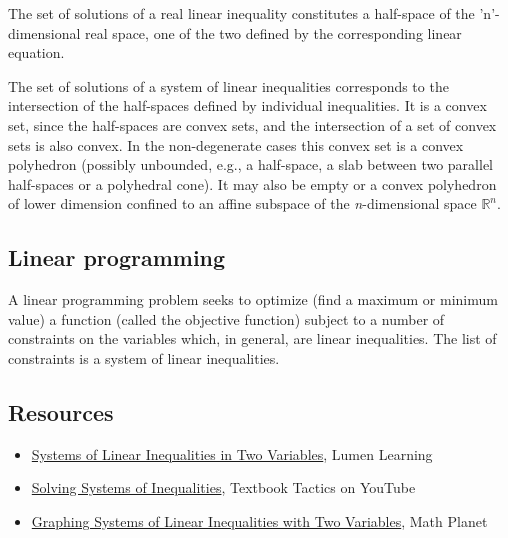 The set of solutions of a real linear inequality constitutes a half-space of the
'n'-dimensional real space, one of the two defined by the corresponding linear equation.



The set of solutions of a system of linear inequalities corresponds to the intersection of
the half-spaces defined by individual inequalities. It is a convex set, since the
half-spaces are convex sets, and the intersection of a set of convex sets is also convex.
In the non-degenerate cases this convex set is a convex polyhedron (possibly unbounded,
e.g., a half-space, a slab between two parallel half-spaces or a polyhedral cone). It may
also be empty or a convex polyhedron of lower dimension confined to an affine subspace of
the \textit{n}-dimensional space $\mathbb{R} ^n$.




\subsection{Linear programming}
\label{sss:line-1d66}




A linear programming problem seeks to optimize (find a maximum or minimum value) a
function (called the objective function) subject to a number of constraints on the
variables which, in general, are linear inequalities. The list of constraints is a system
of linear inequalities.




\subsection{Resources}
\label{sss:reso-55b5}




\begin{itemize}
    \item \href{https://courses.lumenlearning.com/cuny-hunter-collegealgebra/chapter/outcome-graphing-linear-equations/}{Systems of Linear Inequalities in Two Variables}, Lumen Learning
    \item \href{https://www.youtube.com/watch?v=PAb1lCtpF8w}{Solving Systems of Inequalities}, Textbook Tactics on YouTube
    \item \href{https://www.mathplanet.com/education/algebra-1/systems-of-linear-equations-and-inequalities/systems-of-linear-inequalities}{Graphing Systems of Linear Inequalities with Two Variables}, Math Planet
\end{itemize}


